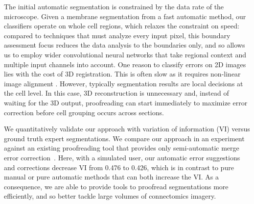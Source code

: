 The initial automatic segmentation is constrained by the data rate of the microscope. Given a membrane segmentation from a fast automatic method, our classifiers operate on whole cell regions, which relaxes the constraint on speed: compared to techniques that must analyze every input pixel, this boundary assessment focus reduces the data analysis to the boundaries only, and so allows us to employ wider convolutional neural networks that take regional context and multiple input channels into account. One reason to classify errors on 2D images lies with the cost of 3D registration. This is often slow as it requires non-linear image alignment \cite{akselrod09,Saalfeld2010Asrigidaspossible}. However, typically segmentation results are local decisions at the cell level. In this case, 3D reconstruction is unnecessary and, instead of waiting for the 3D output, proofreading can start immediately to maximize error correction before cell grouping occurs across sections.

We quantitatively validate our approach with variation of information (VI) versus ground truth expert segmentations. We compare our approach in an experiment against an existing proofreading tool that provides only semi-automatic merge error correction~\cite{haehn_dojo_2014}. Here, with a simulated user, our automatic error suggestions and corrections decrease VI from 0.476 to 0.426, which is in contrast to pure manual or pure automatic methods that can both increase the VI. As a consequence, we are able to provide tools to proofread segmentations more efficiently, and so better tackle large volumes of connectomics imagery.

%
%
